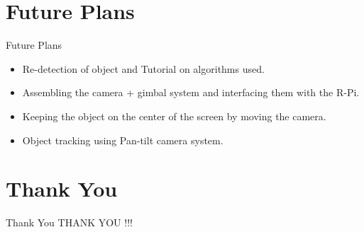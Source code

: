 \documentclass[10pt, a4paper]{beamer}
\begin{document}
\section{Future Plans}
\begin{frame}{Future Plans}
	\begin{itemize}
	\item Re-detection of object and Tutorial on algorithms used.
	\item Assembling the camera + gimbal system and interfacing them with the R-Pi.
	\item Keeping the object on the center of the screen by moving the camera.
	\item Object tracking using Pan-tilt camera system.
	\end{itemize}
\end{frame}


\section{Thank You}
\begin{frame}{Thank You}
	\centering THANK YOU !!!
\end{frame}
\end{document}
